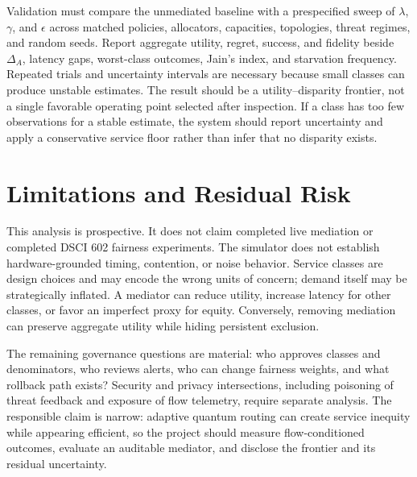 \documentclass[10pt,conference]{IEEEtran}
\begin{document}
Validation must compare the unmediated baseline with a prespecified sweep of
$\lambda$, $\gamma$, and $\epsilon$ across matched policies, allocators,
capacities, topologies, threat regimes, and random seeds. Report aggregate
utility, regret, success, and fidelity beside $\Delta_A$, latency gaps,
worst-class outcomes, Jain's index, and starvation frequency. Repeated trials
and uncertainty intervals are necessary because small classes can produce
unstable estimates. The result should be a utility--disparity frontier, not a
single favorable operating point selected after inspection. If a class has too
few observations for a stable estimate, the system should report uncertainty
and apply a conservative service floor rather than infer that no disparity
exists.

\section{Limitations and Residual Risk}
This analysis is prospective. It does not claim completed live mediation or
completed DSCI 602 fairness experiments. The simulator does not establish
hardware-grounded timing, contention, or noise behavior. Service classes are
design choices and may encode the wrong units of concern; demand itself may be
strategically inflated. A mediator can reduce utility, increase latency for
other classes, or favor an imperfect proxy for equity. Conversely, removing
mediation can preserve aggregate utility while hiding persistent exclusion.

The remaining governance questions are material: who approves classes and
denominators, who reviews alerts, who can change fairness weights, and what
rollback path exists? Security and privacy intersections, including poisoning
of threat feedback and exposure of flow telemetry, require separate analysis.
The responsible claim is narrow: adaptive quantum routing can create
service inequity while appearing efficient, so the project should measure
flow-conditioned outcomes, evaluate an auditable mediator, and disclose the
frontier and its residual uncertainty.


	{}
	{}
\end{document}
